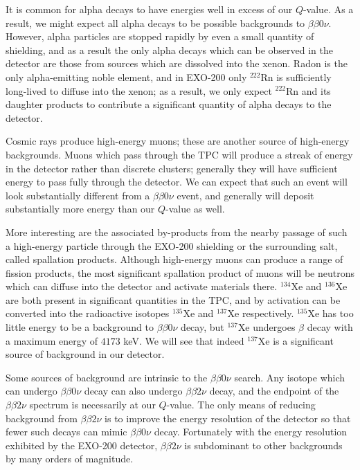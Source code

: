 It is common for alpha decays to have energies well in excess of our $Q$-value.  As a result, we might expect all alpha decays to be possible backgrounds to $\beta\beta 0\nu$.  However, alpha particles are stopped rapidly by even a small quantity of shielding, and as a result the only alpha decays which can be observed in the detector are those from sources which are dissolved into the xenon.  Radon is the only alpha-emitting noble element, and in EXO-200 only $^{222}$Rn is sufficiently long-lived to diffuse into the xenon; as a result, we only expect $^{222}$Rn and its daughter products to contribute a significant quantity of alpha decays to the detector.

Cosmic rays produce high-energy muons; these are another source of high-energy backgrounds.  Muons which pass through the TPC will produce a streak of energy in the detector rather than discrete clusters; generally they will have sufficient energy to pass fully through the detector.  We can expect that such an event will look substantially different from a $\beta\beta 0\nu$ event, and generally will deposit substantially more energy than our $Q$-value as well.

More interesting are the associated by-products from the nearby passage of such a high-energy particle through the EXO-200 shielding or the surrounding salt, called spallation products.  Although high-energy muons can produce a range of fission products, the most significant spallation product of muons will be neutrons which can diffuse into the detector and activate materials there.  $^{134}$Xe and $^{136}$Xe are both present in significant quantities in the TPC, and by activation can be converted into the radioactive isotopes $^{135}$Xe and $^{137}$Xe respectively.  $^{135}$Xe has too little energy to be a background to $\beta\beta 0\nu$ decay, but $^{137}$Xe undergoes $\beta$ decay with a maximum energy of $4173$ keV.  We will see that indeed $^{137}$Xe is a significant source of background in our detector.~\cite{NewEXObb0nPaper_2014,NeutronCaptureGammas}

Some sources of background are intrinsic to the $\beta\beta 0\nu$ search.  Any isotope which can undergo $\beta\beta 0\nu$ decay can also undergo $\beta\beta 2\nu$ decay, and the endpoint of the $\beta\beta 2\nu$ spectrum is necessarily at our $Q$-value.  The only means of reducing background from $\beta\beta 2\nu$ is to improve the energy resolution of the detector so that fewer such decays can mimic $\beta\beta 0\nu$ decay.  Fortunately with the energy resolution exhibited by the EXO-200 detector, $\beta\beta 2\nu$ is subdominant to other backgrounds by many orders of magnitude.~\cite{NewEXObb0nPaper_2014}

